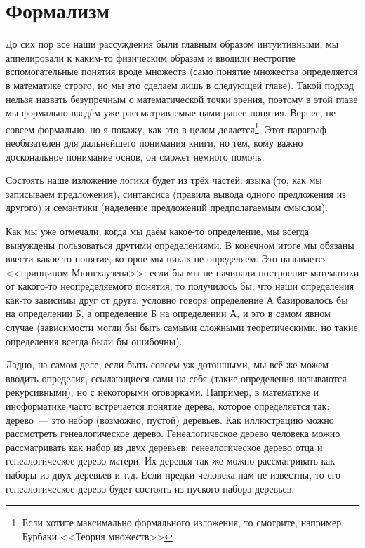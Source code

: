 \section{Формализм}

До сих пор все наши рассуждения были главным образом интуитивными, мы аппелировали к каким-то физическим образам и вводили нестрогие вспомогательные понятия вроде множеств (само понятие множества определяется в математике строго, но мы это сделаем лишь в следующей главе). Такой подход нельзя назвать безупречным с математической точки зрения, поэтому в этой главе мы формально введём уже рассматриваемые нами ранее понятия.  Вернее, не совсем формально, но я покажу, как это в целом делается\footnote{Если хотите максимально формального изложения, то смотрите, например, Бурбаки <<Теория множеств>>}. Этот параграф необязателен для дальнейшего понимания книги, но тем, кому важно доскональное понимание основ, он сможет немного помочь.

Состоять наше изложение логики будет из трёх частей: языка (то, как мы записываем предложения), синтаксиса (правила вывода одного предложения из другого) и семантики (наделение предложений предполагаемым смыслом).

Как мы уже отмечали, когда мы даём какое-то определение, мы всегда вынуждены пользоваться другими определениями. В конечном итоге мы обязаны ввести какое-то понятие, которое мы никак не определяем. Это называется <<принципом Мюнгхаузена>>: если бы мы не начинали построение математики от какого-то неопределяемого понятия, то получилось бы, что наши определения как-то зависимы друг от друга: условно говоря определение А базировалось бы на определении Б, а определение Б на определении А, и это в самом явном случае (зависимости могли бы быть самыми сложными теоретическими, но такие определения всегда были бы ошибочны).

Ладно, на самом деле, если быть совсем уж дотошными, мы всё же можем вводить определия, ссылающиеся сами на себя (такие определения называются рекурсивными), но с некоторыми оговорками. Например, в математике и иноформатике часто встречается понятие дерева, которое определяется так: дерево~--- это набор (возможно, пустой) деревьев. Как иллюстрацию можно рассмотреть генеалогическое дерево. Генеалогическое дерево человека можно рассматривать как набор из двух деревьев: генеалогическое дерево отца и генеалогическое дерево матери. Их деревья так же можно рассматривать как наборы из двух деревьев и т.д. Если предки человека нам не известны, то его генеалогическое дерево будет состоять из пуского набора деревьев.

